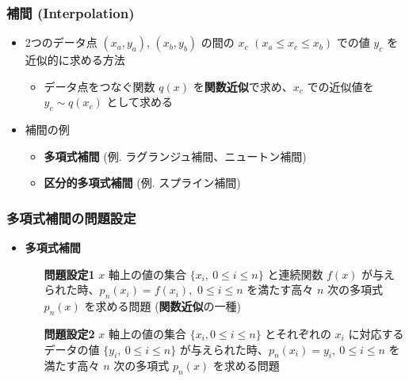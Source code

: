 \documentclass[dvipdfmx,aspectratio=169,20pt]{beamer}
\newcommand{\myfontsetting}[3]{{\fontsize{#1}{#2}\selectfont #3}}
\begin{document}
\begin{frame}
\frametitle{補間 {\small (Interpolation)}}

\begin{itemize}
    \setlength{\itemsep}{0.25cm}
    \item \myfontsetting{18pt}{18pt}{ 2つのデータ点 $(x_a, y_a)$, $(x_b, y_b)$ の間の $x_c$ \myfontsetting{12pt}{12pt}{ $(x_a\le x_c \le x_b)$} での値 $y_c$ を近似的に求める方法}
    \begin{itemize}
        \item \myfontsetting{15pt}{15pt}{ データ点をつなぐ関数 $q(x)$ を{\bf 関数近似}で求め、$x_c$ での近似値を $y_c\sim q(x_c)$ として求める} 
    \end{itemize}
    \item \myfontsetting{18pt}{18pt}{ 補間の例}
    \begin{itemize}
        \setlength{\itemsep}{0.15cm}
        \item \myfontsetting{15pt}{15pt}{\bf 多項式補間} \myfontsetting{12pt}{12pt}{(例. ラグランジュ補間、ニュートン補間)}
        \item \myfontsetting{15pt}{15pt}{\bf 区分的多項式補間} \myfontsetting{12pt}{12pt}{(例. スプライン補間)}
    \end{itemize}
\end{itemize}
\end{frame}
\begin{frame}
\frametitle{{\large 多項式補間の問題設定}}

\begin{itemize}
    \setlength{\itemsep}{0.15cm}
    \item {\small \bf 多項式補間}
    \begin{itemize}
        \setlength{\itemsep}{0.15cm}
        \item [\myfontsetting{10pt}{10pt}{\bf 問題設定1}] \myfontsetting{14pt}{16pt}{$x$ 軸上の値の集合 $\{x_i,\ 0\le i \le n\}$ と連続関数 $f(x)$ が与えられた時、$p_n(x_i)=f(x_i),$ $0\le i \le n$ を満たす高々 $n$ 次の多項式 $p_n(x)$ を求める問題} \myfontsetting{10pt}{10pt}{({\bf 関数近似}の一種)}
        \item [\myfontsetting{10pt}{10pt}{\bf 問題設定2}] \myfontsetting{14pt}{16pt}{$x$ 軸上の値の集合 $\{x_i,0\le i \le n\}$ とそれぞれの $x_i$ に対応するデータの値 $\{y_i,\ 0\le i\le n\}$ が与えられた時、$p_n(x_i)=y_i,\ 0\le i \le n$ を満たす高々 $n$ 次の多項式 $p_n(x)$ を求める問題}
    \end{itemize}
\end{itemize}
\end{frame}
\end{document}
